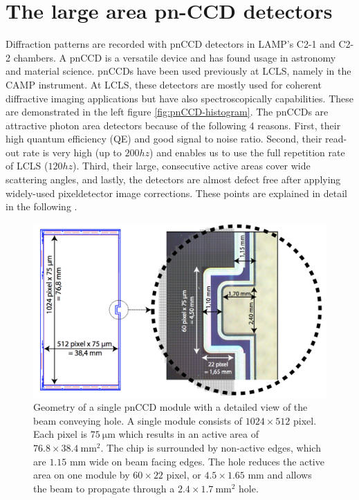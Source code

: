 \section{The large area pn-CCD detectors}\label{sec:pnCCD}
Diffraction patterns are recorded with pnCCD detectors in LAMP's C2-1 and C2-2 chambers. A pnCCD is a versatile device and has found usage in astronomy and material science. pnCCDs have been used previously at LCLS, namely in the CAMP instrument. At LCLS, these detectors are mostly used for coherent diffractive imaging applications but have also spectroscopically capabilities. These are demonstrated in the left figure \ref{fig:pnCCD-histogram}. The pnCCDs are attractive photon area detectors because of the following 4 reasons. First, their high quantum efficiency (QE) and good signal to noise ratio. Second, their read-out rate is very high (up to $200hz$) and enables us to use the full repetition rate of LCLS ($120hz$). Third, their large, consecutive active areas cover wide scattering angles, and lastly, the detectors are almost defect free after applying widely-used pixeldetector image corrections. These points are explained in detail in the following \citep{Bucher-2016-Unpublished}.\\
%
\begin{figure}
   \includegraphics[width=0.8\linewidth]{images/pnCCD-detail.png}
    \caption[Geometry of a single pnCCD module.]{Geometry of a single pnCCD module with a detailed view of the beam conveying hole. A single module consists of $1024 \times 512$ pixel. Each pixel is $75\ \mathrm{\mu m}$ which results in an active area of $76.8 \times 38.4\ \mathrm{mm}^{2}$. The chip is surrounded by non-active edges, which are $1.15$ mm wide on beam facing edges. The hole reduces the active area on one module by $60\times 22$ pixel, or $4.5 \times 1.65$ mm and allows the beam to propagate through a $2.4 \times 1.7 \ \mathrm{mm}^{2}$ hole.}
\label{fig:ccd-detail}
\end{figure}
